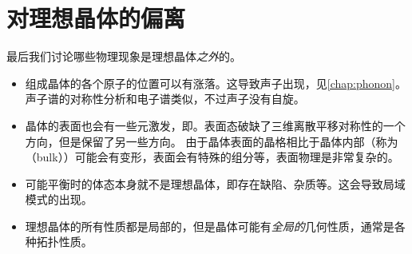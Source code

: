 
\section{对理想晶体的偏离}

最后我们讨论哪些物理现象是理想晶体\emph{之外}的。
\begin{itemize}
    \item 组成晶体的各个原子的位置可以有涨落。这导致声子出现，见\autoref{chap:phonon}。声子谱的对称性分析和电子谱类似，不过声子没有自旋。
    \item 晶体的表面也会有一些元激发，即。表面态破缺了三维离散平移对称性的一个方向，但是保留了另一些方向。
    由于晶体表面的晶格相比于晶体内部（称为（bulk））可能会有变形，表面会有特殊的组分等，表面物理是非常复杂的。
    \item 可能平衡时的体态本身就不是理想晶体，即存在缺陷、杂质等。这会导致局域模式的出现。
    \item 理想晶体的所有性质都是局部的，但是晶体可能有\emph{全局的}几何性质，通常是各种拓扑性质。
\end{itemize}